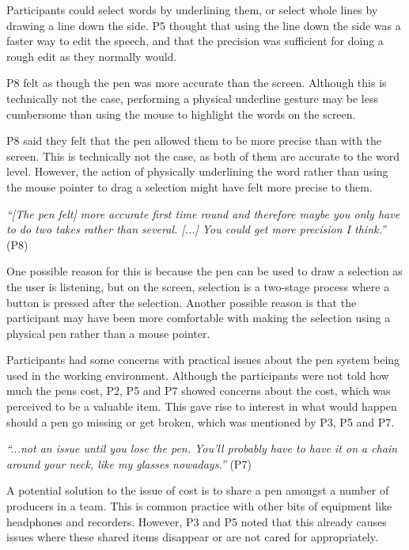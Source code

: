 
Participants could select words by underlining them, or select whole lines by drawing a line down the side. P5 thought
that using the line down the side was a faster way to edit the speech, and that the precision was sufficient for
doing a rough edit as they normally would.

P8 felt as though
the pen was more accurate than the screen. Although this is technically not the case, performing a physical underline
gesture may be less cumbersome than using the mouse to highlight the words on the screen.

P8 said they felt that the pen allowed them to be more precise than with the screen. This is technically not the case,
as both of them are accurate to the word level. However, the action of physically underlining the word rather
than using the mouse pointer to drag a selection might have felt more precise to them.

\textit{``[The pen felt] more accurate first time round and therefore maybe you only have to do two takes rather than
several. [...] You could get more precision I think.''} (P8)

One possible reason for this is because the pen can be used to draw a selection as the user is listening, but on the
screen, selection is a two-stage process where a button is pressed after the selection. Another possible reason is that
the participant may have been more comfortable with making the selection using a physical pen rather than a mouse
pointer.



Participants had some concerns with practical issues about the pen system being used in the working environment.
Although the participants were not told how much the pens cost, P2, P5 and P7 showed concerns about the cost, which was
perceived to be a valuable item.  This gave rise to interest in what would happen should a pen go missing or get
broken, which was mentioned by P3, P5 and P7. 

\textit{``...not an issue until you lose the pen. You'll probably have to have it on a chain around your neck, like my
glasses nowadays.''} (P7)

A potential solution to the issue of cost is to share a pen amongst a number of producers in a team. This is
common practice with other bits of equipment like headphones and recorders. However, P3 and P5 noted that this already
causes issues where these shared items disappear or are not cared for appropriately.

